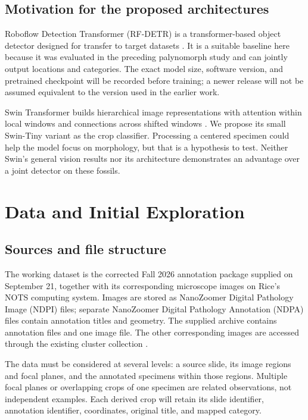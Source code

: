 \documentclass[conference,letterpaper]{IEEEtran}
\begin{document}
\subsection{Motivation for the proposed architectures}
Roboflow Detection Transformer (RF-DETR) is a transformer-based object detector designed for transfer to target datasets \cite{robinson2026}. It is a suitable baseline here because it was evaluated in the preceding palynomorph study and can jointly output locations and categories. The exact model size, software version, and pretrained checkpoint will be recorded before training; a newer release will not be assumed equivalent to the version used in the earlier work.

Swin Transformer builds hierarchical image representations with attention within local windows and connections across shifted windows \cite{liu2021}. We propose its small Swin-Tiny variant as the crop classifier. Processing a centered specimen could help the model focus on morphology, but that is a hypothesis to test. Neither Swin's general vision results nor its architecture demonstrates an advantage over a joint detector on these fossils.

\section{Data and Initial Exploration}
\subsection{Sources and file structure}
The working dataset is the corrected Fall 2026 annotation package supplied on September 21, together with its corresponding microscope images on Rice's NOTS computing system. Images are stored as NanoZoomer Digital Pathology Image (NDPI) files; separate NanoZoomer Digital Pathology Annotation (NDPA) files contain annotation titles and geometry. The supplied archive contains \SlideCount{} annotation files and one image file. The other corresponding images are accessed through the existing cluster collection \cite{inventory2026}.

The data must be considered at several levels: a source slide, its image regions and focal planes, and the annotated specimens within those regions. Multiple focal planes or overlapping crops of one specimen are related observations, not independent examples. Each derived crop will retain its slide identifier, annotation identifier, coordinates, original title, and mapped category.
\end{document}
